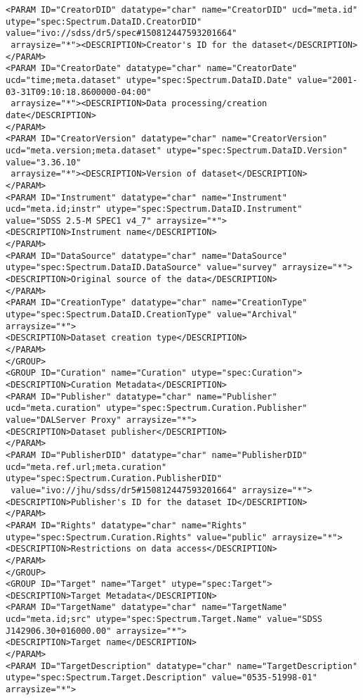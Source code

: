 \begin{landscape}
{\begin{flushleft}
\begin{fmlpage}
\begin{verbatim}
<PARAM ID="CreatorDID" datatype="char" name="CreatorDID" ucd="meta.id" utype="spec:Spectrum.DataID.CreatorDID" value="ivo://sdss/dr5/spec#150812447593201664"
 arraysize="*"><DESCRIPTION>Creator's ID for the dataset</DESCRIPTION>
</PARAM>
<PARAM ID="CreatorDate" datatype="char" name="CreatorDate" ucd="time;meta.dataset" utype="spec:Spectrum.DataID.Date" value="2001-03-31T09:10:18.8600000-04:00" 
 arraysize="*"><DESCRIPTION>Data processing/creation date</DESCRIPTION>
</PARAM>
<PARAM ID="CreatorVersion" datatype="char" name="CreatorVersion" ucd="meta.version;meta.dataset" utype="spec:Spectrum.DataID.Version" value="3.36.10" 
 arraysize="*"><DESCRIPTION>Version of dataset</DESCRIPTION>
</PARAM>
<PARAM ID="Instrument" datatype="char" name="Instrument" ucd="meta.id;instr" utype="spec:Spectrum.DataID.Instrument" value="SDSS 2.5-M SPEC1 v4_7" arraysize="*">
<DESCRIPTION>Instrument name</DESCRIPTION>
</PARAM>
<PARAM ID="DataSource" datatype="char" name="DataSource" utype="spec:Spectrum.DataID.DataSource" value="survey" arraysize="*">
<DESCRIPTION>Original source of the data</DESCRIPTION>
</PARAM>
<PARAM ID="CreationType" datatype="char" name="CreationType" utype="spec:Spectrum.DataID.CreationType" value="Archival" arraysize="*">
<DESCRIPTION>Dataset creation type</DESCRIPTION>
</PARAM>
</GROUP>
<GROUP ID="Curation" name="Curation" utype="spec:Curation">
<DESCRIPTION>Curation Metadata</DESCRIPTION>
<PARAM ID="Publisher" datatype="char" name="Publisher" ucd="meta.curation" utype="spec:Spectrum.Curation.Publisher" value="DALServer Proxy" arraysize="*">
<DESCRIPTION>Dataset publisher</DESCRIPTION>
</PARAM>
<PARAM ID="PublisherDID" datatype="char" name="PublisherDID" ucd="meta.ref.url;meta.curation" utype="spec:Spectrum.Curation.PublisherDID" 
 value="ivo://jhu/sdss/dr5#150812447593201664" arraysize="*"><DESCRIPTION>Publisher's ID for the dataset ID</DESCRIPTION>
</PARAM>
<PARAM ID="Rights" datatype="char" name="Rights" utype="spec:Spectrum.Curation.Rights" value="public" arraysize="*">
<DESCRIPTION>Restrictions on data access</DESCRIPTION>
</PARAM>
</GROUP>
<GROUP ID="Target" name="Target" utype="spec:Target">
<DESCRIPTION>Target Metadata</DESCRIPTION>
<PARAM ID="TargetName" datatype="char" name="TargetName" ucd="meta.id;src" utype="spec:Spectrum.Target.Name" value="SDSS J142906.30+016000.00" arraysize="*">
<DESCRIPTION>Target name</DESCRIPTION>
</PARAM>
<PARAM ID="TargetDescription" datatype="char" name="TargetDescription" utype="spec:Spectrum.Target.Description" value="0535-51998-01" arraysize="*">

\end{verbatim}
\end{fmlpage}
\end{flushleft}}
\end{landscape}
